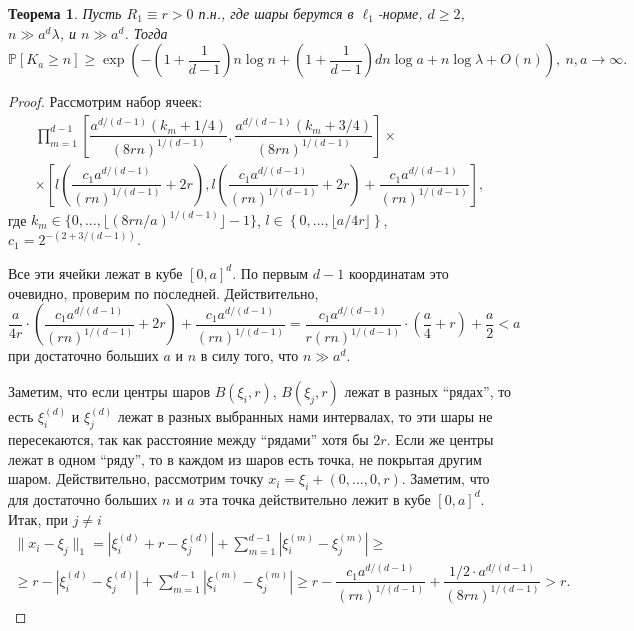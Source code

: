 \documentclass[12pt]{article}
\theoremstyle{plain}
\newtheorem{thm}{Теорема} %
\theoremstyle{definition}
\theoremstyle{remark}
\def\geq{\geqslant}
\newcommand{\PP}{\mathbb{P}}
\begin{document}
\begin{thm}\label{lowconst1}
Пусть $R_1\equiv r > 0$ п.н., где шары берутся в $\ell_1$-норме, $d\geq 2$, $n \gg a^d\lambda$, и $n\gg a^d$. 
Тогда $$\PP[K_a \geq n] \geq \exp \left(-\left(1+\dfrac{1}{d-1}\right)n\log n + \left(1+\dfrac{1}{d-1}\right)dn\log a  + n\log\lambda + O(n)\right),\  n, a\to \infty.$$
\end{thm}{}

\begin{proof}
    Рассмотрим набор ячеек: 
    \begin{multline*}
        \prod\limits_{m=1}^{d-1}\left[\dfrac{a^{d/(d-1)}(k_m+1/4)}{(8rn)^{1/(d-1)}}, \dfrac{a^{d/(d-1)}(k_m+3/4)}{(8rn)^{1/(d-1)}}\right]
    \times \\
    \times \left[l\left(\dfrac{c_1a^{d/(d-1)}}{(rn)^{1/(d-1)}} +2r\right) ,  l\left(\dfrac{c_1a^{d/(d-1)}}{(rn)^{1/(d-1)}}+2r\right) + \dfrac{c_1a^{d/(d-1)}}{(rn)^{1/(d-1)}}  \right],
    \end{multline*}{}
    где $k_m \in \{0, \ldots, \lfloor (8rn/a)^{1/(d-1)}\rfloor-1\}$, $l\in \left\{0, \ldots, \lfloor a/4r\rfloor\right\}$, $c_1 = 2^{-(2+3/(d-1))}$. 
    
    Все эти ячейки лежат в кубе $[0,a]^d$. По первым $d-1$ координатам это очевидно, проверим по последней. Действительно, 
    \begin{equation*}
        \dfrac{a}{4r}\cdot\left(\dfrac{c_1a^{d/(d-1)}}{(rn)^{1/(d-1)}}+2r\right) + \dfrac{c_1a^{d/(d-1)}}{(rn)^{1/(d-1)}} %
        = \dfrac{c_1a^{d/(d-1)}}{r(rn)^{1/(d-1)}}\cdot\left(\dfrac{a}{4} + r\right) + \dfrac{a}{2}
        < a
    \end{equation*}{}
    при достаточно больших $a$ и $n$ в силу того, что $n \gg a^d$.
    
    Заметим, что если центры шаров $B(\xi_i, r)$, $B(\xi_j, r)$ лежат в разных ``рядах'', то есть $\xi_i^{(d)}$ и $\xi_j^{(d)}$ лежат в разных выбранных нами интервалах, то эти шары не пересекаются, так как расстояние между ``рядами'' хотя бы $2r$. Если же центры лежат в одном ``ряду'', то в каждом из шаров есть точка, не покрытая другим шаром. Действительно, рассмотрим точку  $x_i = \xi_i + (0, \ldots, 0, r)$. Заметим, что для достаточно больших $n$ и $a$ эта точка действительно лежит в кубе $[0, a]^d$. Итак, при $j \not= i$
    \begin{multline*}
        \|x_i - \xi_j\|_1 = 
        |\xi_i^{(d)} + r - \xi_j^{(d)} | + \sum_{m=1}^{d-1}|\xi_i^{(m)} - \xi_j^{(m)}| \geq\\
        \geq r - |\xi_i^{(d)} - \xi_j^{(d)} | + \sum_{m=1}^{d-1}|\xi_i^{(m)} - \xi_j^{(m)}| \geq
        r - \dfrac{c_1a^{d/(d-1)}}{(rn)^{1/(d-1)}} + \dfrac{1/2\cdot a^{d/(d-1)}}{(8rn)^{1/(d-1)}} > r.
    \end{multline*}{}
    

\end{proof}
\end{document}
